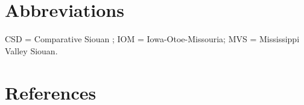 \documentclass[output=paper]{LSP/langsci}
\begin{document}
\section*{Abbreviations}

CSD = Comparative Siouan \citet{Dictionary2006}; IOM = Iowa-Otoe-Missouria; MVS = Mississippi Valley Siouan.


\section*{References} 

\printbibliography[heading=subbibliography,notkeyword=this]
 
\end{document}
